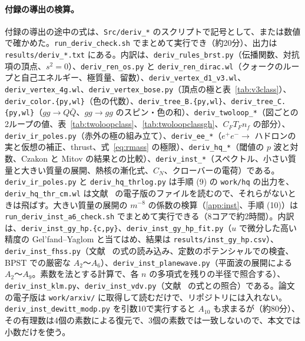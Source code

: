 \documentclass[a4paper,10pt]{ltjsarticle}
\begin{document}
\paragraph{付録の導出の検算。}付録の導出の途中の式は、\texttt{Src/deriv\_*} のスクリプトで記号として、または数値で確かめた。\texttt{run\_deriv\_check.sh} でまとめて実行でき（約20分）、出力は \texttt{results/deriv\_*.txt} にある。内訳は、\texttt{deriv\_rules\_brst.py}（伝播関数、対抗項の頂点、$s^2=0$）、\texttt{deriv\_ren\_os.py} と \texttt{deriv\_ren\_dirac.wl}（クォークのループと自己エネルギー、極質量、留数）、\texttt{deriv\_vertex\_d1\_v3.wl}、\texttt{deriv\_vertex\_4g.wl}、\texttt{deriv\_vertex\_bose.py}（頂点の極と表~\ref{tab:v3class}）、\texttt{deriv\_color.\{py,wl\}}（色の代数）、\texttt{deriv\_tree\_B.\{py,wl\}}、\texttt{deriv\_tree\_C.\{py,wl\}}（$gg\to Q\bar Q$、$gg\to gg$ のスピン・色の和）、\texttt{deriv\_twoloop\_*}（図ごとの2ループの値、表~\ref{tab:twoloopclass}、\ref{tab:twoloopclassgh}、$C_FT_Fn_f$ の部分）、\texttt{deriv\_ir\_poles.py}（赤外の極の組み立て）、\texttt{deriv\_ee\_*}（$e^+e^-\to$ ハドロンの実と仮想の補正、thrust、式~\eqref{eq:rmass} の極限）、\texttt{deriv\_hq\_*}（閾値の $p$ 波と対数、Czakon と Mitov の結果との比較）、\texttt{deriv\_inst\_*}（スペクトル、小さい質量と大きい質量の展開、熱核の漸化式、$C_N$、クローバーの電荷）である。\texttt{deriv\_ir\_poles.py} と \texttt{deriv\_hq\_thrlog.py} は手順 (9) の \texttt{work/hq} の出力を、\texttt{deriv\_hq\_thr\_cm.wl} は文献~\cite{cm10} の電子版のファイルを読むので、それらがないときは飛ばす。大きい質量の展開の $m^{-8}$ の係数の検算（\ref{app:inst}、手順 (10)）は \texttt{run\_deriv\_inst\_a6\_check.sh} でまとめて実行できる（8コアで約2時間）。内訳は、\texttt{deriv\_inst\_gy\_hp.\{c,py\}}、\texttt{deriv\_inst\_gy\_hp\_fit.py}（$u$ で微分した高い精度の Gel'fand--Yaglom と当てはめ、結果は \texttt{results/inst\_gy\_hp.csv}）、\texttt{deriv\_inst\_fhss.py}（文献~\cite{fhss98} の式の読み込み、定数のポテンシャルでの検査、BPST での厳密な $A_2$〜$A_6$）、\texttt{deriv\_inst\_planewave.py}（平面波の展開による $A_2$〜$A_9$。素数を法とする計算で、各 $n$ の多項式を残りの半径で照合する）、\texttt{deriv\_inst\_klm.py}、\texttt{deriv\_inst\_vdv.py}（文献~\cite{klm00,vdv98} の式との照合）である。論文の電子版は \texttt{work/arxiv/} に取得して読むだけで、リポジトリには入れない。\texttt{deriv\_inst\_dewitt\_modp.py} を引数10で実行すると $A_{10}$ も求まるが（約80分）、その有理数は4個の素数による復元で、3個の素数では一致しないので、本文では小数だけを使う。
\end{document}
